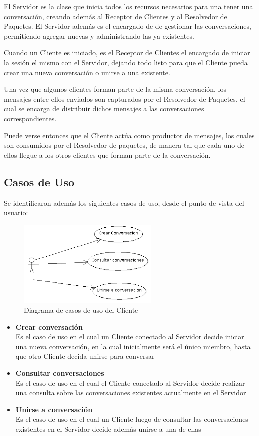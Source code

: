 \documentclass[a4paper,12pt,titlepage]{article}
\begin{document}
El Servidor es la clase que inicia todos los recursos necesarios para una tener una conversación, creando además
al Receptor de Clientes y al Resolvedor de Paquetes. El Servidor además es el encargado de de gestionar las 
conversaciones, permitiendo agregar nuevas y administrando las ya existentes.

Cuando un Cliente es iniciado, es el Receptor de Clientes el encargado de iniciar la sesión el mismo con el Servidor, 
dejando todo listo para que el Cliente pueda crear una nueva conversación o unirse a una existente.

Una vez que algunos clientes forman parte de la misma conversación, los mensajes entre ellos enviados son capturados
por el Resolvedor de Paquetes, el cual se encarga de distribuir dichos mensajes a las conversaciones correspondientes.

Puede verse entonces que el Cliente actúa como productor de mensajes, los cuales son consumidos por el Resolvedor
de paquetes, de manera tal que cada uno de ellos llegue a los otros clientes que forman parte de la conversación.

\subsection{Casos de Uso}
Se identificaron además los siguientes casos de uso, desde el punto de vista del usuario:\\
\begin{figure}[h!]
\centering
\includegraphics[width=0.6\textwidth]{CasosDeUso.png}
\caption{Diagrama de casos de uso del Cliente}
\label{fig:casos_uso}
\end{figure}

\begin{itemize}
\item \textbf{Crear conversación}\\ 
  Es el caso de uso en el cual un Cliente conectado al Servidor decide iniciar una nueva conversación, en la cual inicialmente
  será el único miembro, hasta que otro Cliente decida unirse para conversar
\item \textbf{Consultar conversaciones}\\
  Es el caso de uso en el cual el Cliente conectado al Servidor decide realizar una consulta sobre las conversaciones
  existentes actualmente en el Servidor
\item \textbf{Unirse a conversación}\\
  Es el caso de uso en el cual un Cliente luego de consultar las conversaciones existentes en el Servidor decide además
  unirse a una de ellas\\
\end{itemize} 
\end{document}
